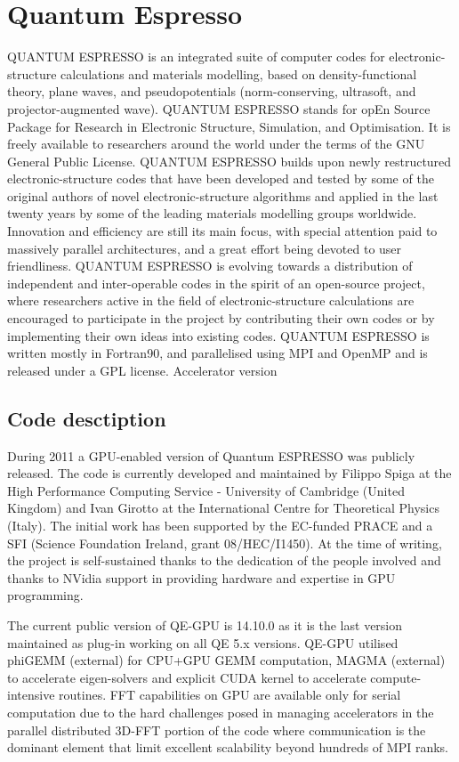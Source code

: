 \section{Quantum Espresso}

QUANTUM ESPRESSO is an integrated suite of computer codes for electronic-structure calculations and materials modelling, based on density-functional theory, plane waves, and pseudopotentials (norm-conserving, ultrasoft, and projector-augmented wave). QUANTUM ESPRESSO stands for opEn Source Package for Research in Electronic Structure, Simulation, and Optimisation. It is freely available to researchers around the world under the terms of the GNU General Public License. QUANTUM ESPRESSO builds upon newly restructured electronic-structure codes that have been developed and tested by some of the original authors of novel electronic-structure algorithms and applied in the last twenty years by some of the leading materials modelling groups worldwide. Innovation and efficiency are still its main focus, with special attention paid to massively parallel architectures, and a great effort being devoted to user friendliness. QUANTUM ESPRESSO is evolving towards a distribution of independent and inter-operable codes in the spirit of an open-source project, where researchers active in the field of electronic-structure calculations are encouraged to participate in the project by contributing their own codes or by implementing their own ideas into existing codes.
QUANTUM ESPRESSO is written mostly in Fortran90, and parallelised using MPI and OpenMP and is released under a GPL license.
Accelerator version

\subsection{Code desctiption}

During 2011 a GPU-enabled version of Quantum ESPRESSO was publicly released. The code is currently developed and maintained by Filippo Spiga at the High Performance Computing Service - University of Cambridge (United Kingdom) and Ivan Girotto at the International Centre for Theoretical Physics (Italy). The initial work has been supported by the EC-funded PRACE and a SFI (Science Foundation Ireland, grant 08/HEC/I1450). At the time of writing, the project is self-sustained thanks to the dedication of the people involved and thanks to NVidia support in providing hardware and expertise in GPU programming.

The current public version of QE-GPU is 14.10.0 as it is the last version maintained as plug-in working on all QE 5.x versions. QE-GPU utilised phiGEMM (external) for CPU+GPU GEMM computation, MAGMA (external) to accelerate eigen-solvers and explicit CUDA kernel to accelerate compute-intensive routines. FFT capabilities on GPU are available only for serial computation due to the hard challenges posed in managing accelerators in the parallel distributed 3D-FFT portion of the code where communication is the dominant element that limit excellent scalability beyond hundreds of MPI ranks.

